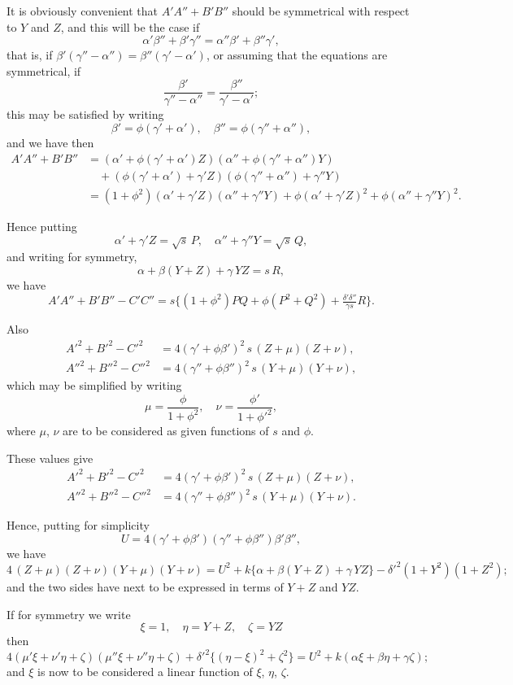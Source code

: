 \documentclass[11pt,a4paper]{book}
\begin{document}
It is obviously convenient that $A'A''+B'B''$ should be symmetrical with respect to $Y$ and $Z$, and this will be the case if
\[
\alpha'\beta''+\beta'\gamma'' = \alpha''\beta'+\beta''\gamma',
\]
that is, if $\beta'(\gamma''-\alpha'') = \beta''(\gamma'-\alpha')$, or assuming that the equations are symmetrical, if
\[
\frac{\beta'}{\gamma''-\alpha''} = \frac{\beta''}{\gamma'-\alpha'};
\]
this may be satisfied by writing
\[
\beta' = \phi(\gamma'+\alpha'), \quad \beta'' = \phi(\gamma''+\alpha''),
\]
and we have then
\begin{align*}
A'A''+B'B'' &= (\alpha'+\phi(\gamma'+\alpha')Z)(\alpha''+\phi(\gamma''+\alpha'')Y) \\
&\quad + (\phi(\gamma'+\alpha')+\gamma'Z)(\phi(\gamma''+\alpha'')+\gamma''Y) \\
&= (1+\phi^2)(\alpha'+\gamma'Z)(\alpha''+\gamma''Y) + \phi(\alpha'+\gamma'Z)^2 + \phi(\alpha''+\gamma''Y)^2.
\end{align*}

Hence putting
\[
\alpha'+\gamma'Z = \sqrt{s}\,P, \quad \alpha''+\gamma''Y = \sqrt{s}\,Q,
\]
and writing for symmetry,
\[
\alpha+\beta(Y+Z)+\gamma\,YZ = s\,R,
\]
we have
\[
A'A''+B'B''-C'C'' = s\{(1+\phi^2)PQ+\phi(P^2+Q^2)+\tfrac{\delta'\delta''}{\gamma s}R\}.
\]

Also
\begin{align*}
A'^2+B'^2-C'^2 &= 4(\gamma'+\phi\beta')^2\,s\,(Z+\mu)(Z+\nu),\\
A''^2+B''^2-C''^2 &= 4(\gamma''+\phi\beta'')^2\,s\,(Y+\mu)(Y+\nu),
\end{align*}
which may be simplified by writing
\[
\mu = \frac{\phi}{1+\phi^2}, \quad \nu = \frac{\phi'}{1+\phi'^2},
\]
where $\mu$, $\nu$ are to be considered as given functions of $s$ and $\phi$.

These values give
\begin{align*}
A'^2+B'^2-C'^2 &= 4(\gamma'+\phi\beta')^2\,s\,(Z+\mu)(Z+\nu),\\
A''^2+B''^2-C''^2 &= 4(\gamma''+\phi\beta'')^2\,s\,(Y+\mu)(Y+\nu).
\end{align*}

Hence, putting for simplicity
\[
U = 4(\gamma'+\phi\beta')(\gamma''+\phi\beta'')\beta'\beta'',
\]
we have
\[
4\,(Z+\mu)(Z+\nu)(Y+\mu)(Y+\nu) = U^2 + k\{\alpha+\beta(Y+Z)+\gamma\,YZ\} - \delta'^2(1+Y^2)(1+Z^2);
\]
and the two sides have next to be expressed in terms of $Y+Z$ and $YZ$.

If for symmetry we write
\[
\xi = 1, \quad \eta = Y+Z, \quad \zeta = YZ
\]
then
\[
4(\mu'\xi+\nu'\eta+\zeta)(\mu''\xi+\nu''\eta+\zeta) + \delta'^2\{(\eta-\xi)^2+\zeta^2\} = U^2 + k(\alpha\xi+\beta\eta+\gamma\zeta);
\]
and $\xi$ is now to be considered a linear function of $\xi$, $\eta$, $\zeta$.
\end{document}
